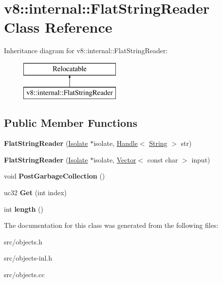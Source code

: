 \hypertarget{classv8_1_1internal_1_1_flat_string_reader}{}\section{v8\+:\+:internal\+:\+:Flat\+String\+Reader Class Reference}
\label{classv8_1_1internal_1_1_flat_string_reader}
Inheritance diagram for v8\+:\+:internal\+:\+:Flat\+String\+Reader\+:\begin{figure}[H]
\begin{center}
\leavevmode
\includegraphics[height=2.000000cm]{classv8_1_1internal_1_1_flat_string_reader}
\end{center}
\end{figure}
\subsection*{Public Member Functions}
\begin{DoxyCompactItemize}
\item 
\hypertarget{classv8_1_1internal_1_1_flat_string_reader_ae2b7accc58c68221f7b45520b544cd64}{}{\bfseries Flat\+String\+Reader} (\hyperlink{classv8_1_1internal_1_1_isolate}{Isolate} $\ast$isolate, \hyperlink{classv8_1_1internal_1_1_handle}{Handle}$<$ \hyperlink{classv8_1_1internal_1_1_string}{String} $>$ str)\label{classv8_1_1internal_1_1_flat_string_reader_ae2b7accc58c68221f7b45520b544cd64}

\item 
\hypertarget{classv8_1_1internal_1_1_flat_string_reader_af3203553f086dd868b51f25b8bddbbcb}{}{\bfseries Flat\+String\+Reader} (\hyperlink{classv8_1_1internal_1_1_isolate}{Isolate} $\ast$isolate, \hyperlink{classv8_1_1internal_1_1_vector}{Vector}$<$ const char $>$ input)\label{classv8_1_1internal_1_1_flat_string_reader_af3203553f086dd868b51f25b8bddbbcb}

\item 
\hypertarget{classv8_1_1internal_1_1_flat_string_reader_a34cb461fd78aeaecc370c7583ce64589}{}void {\bfseries Post\+Garbage\+Collection} ()\label{classv8_1_1internal_1_1_flat_string_reader_a34cb461fd78aeaecc370c7583ce64589}

\item 
\hypertarget{classv8_1_1internal_1_1_flat_string_reader_a7499abcea8aef7a95d961141a1219db9}{}uc32 {\bfseries Get} (int index)\label{classv8_1_1internal_1_1_flat_string_reader_a7499abcea8aef7a95d961141a1219db9}

\item 
\hypertarget{classv8_1_1internal_1_1_flat_string_reader_af402065726c67b6223a3f09df2156a45}{}int {\bfseries length} ()\label{classv8_1_1internal_1_1_flat_string_reader_af402065726c67b6223a3f09df2156a45}

\end{DoxyCompactItemize}


The documentation for this class was generated from the following files\+:\begin{DoxyCompactItemize}
\item 
src/objects.\+h\item 
src/objects-\/inl.\+h\item 
src/objects.\+cc\end{DoxyCompactItemize}
